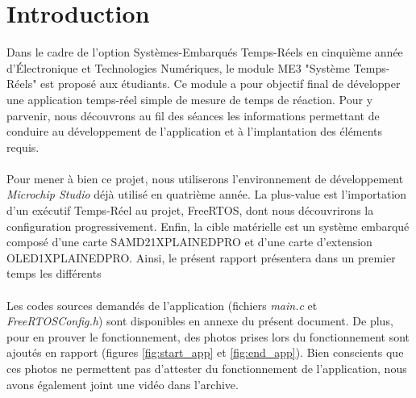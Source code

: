\section*{Introduction}

\gap

\indent Dans le cadre de l'option Systèmes-Embarqués Temps-Réels en cinquième année d'Électronique et Technologies Numériques, le module ME3 "Système Temps-Réels" est proposé aux étudiants.
Ce module a pour objectif final de développer une application temps-réel simple de mesure de temps de réaction. Pour y parvenir, nous découvrons au fil des séances les informations permettant de conduire au développement de l'application et à l'implantation des éléments requis.
\\\\
\indent Pour mener à bien ce projet, nous utiliserons l'environnement de développement \textit{Microchip Studio} déjà utilisé en quatrième année.
La plus-value est l'importation d'un exécutif Temps-Réel au projet, FreeRTOS, dont nous découvrirons la configuration progressivement.
Enfin, la cible matérielle est un système embarqué composé d'une carte SAMD21XPLAINEDPRO et d'une carte d'extension OLED1XPLAINEDPRO.
Ainsi, le présent rapport présentera dans un premier temps les différents
\\\\
\indent Les codes sources demandés de l'application (fichiers \textit{main.c} et \textit{FreeRTOSConfig.h}) sont disponibles en annexe du présent document.
De plus, pour en prouver le fonctionnement, des photos prises lors du fonctionnement sont ajoutés en rapport (figures \ref{fig:start_app} et \ref{fig:end_app}).
Bien conscients que ces photos ne permettent pas d'attester du fonctionnement de l'application, nous avons également joint une vidéo dans l'archive.
